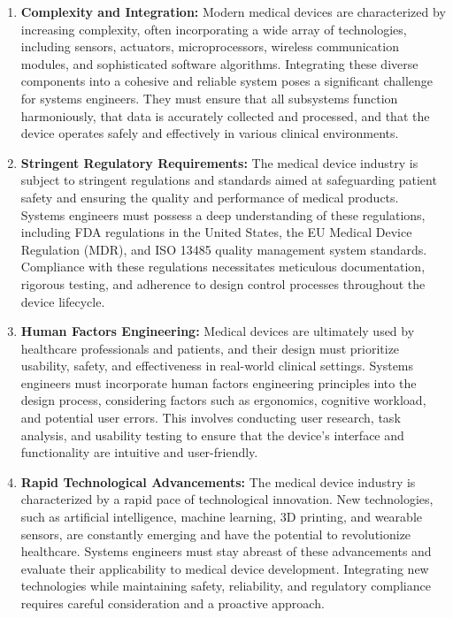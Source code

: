 \documentclass[conference]{IEEEtran}
\begin{document}
    \begin{enumerate}
        \item \textbf{Complexity and Integration:} Modern medical 
        devices are characterized by increasing complexity, often 
        incorporating a wide array of technologies, including sensors, 
        actuators, microprocessors, wireless communication modules, 
        and sophisticated software algorithms. Integrating these diverse 
        components into a cohesive and reliable system poses a significant 
        challenge for systems engineers. They must ensure that all 
        subsystems function harmoniously, that data is accurately 
        collected and processed, and that the device operates safely 
        and effectively in various clinical environments.

        \item \textbf{Stringent Regulatory Requirements:} The medical 
        device industry is subject to stringent regulations and 
        standards aimed at safeguarding patient safety and ensuring 
        the quality and performance of medical products. Systems 
        engineers must possess a deep understanding of these 
        regulations, including FDA regulations in the United States, 
        the EU Medical Device Regulation (MDR), and ISO 13485 quality 
        management system standards. Compliance with these regulations 
        necessitates meticulous documentation, rigorous testing, and 
        adherence to design control processes throughout the device 
        lifecycle.

        \item \textbf{Human Factors Engineering:} Medical devices are 
        ultimately used by healthcare professionals and patients, 
        and their design must prioritize usability, safety, and 
        effectiveness in real-world clinical settings. Systems 
        engineers must incorporate human factors engineering 
        principles into the design process, considering factors such 
        as ergonomics, cognitive workload, and potential user errors. 
        This involves conducting user research, task analysis, 
        and usability testing to ensure that the device's interface 
        and functionality are intuitive and user-friendly.

        \item \textbf{Rapid Technological Advancements:} The medical 
        device industry is characterized by a rapid pace of 
        technological innovation. New technologies, such as artificial 
        intelligence, machine learning, 3D printing, and wearable 
        sensors, are constantly emerging and have the potential to 
        revolutionize healthcare. Systems engineers must stay abreast 
        of these advancements and evaluate their applicability to 
        medical device development. Integrating new technologies 
        while maintaining safety, reliability, and regulatory 
        compliance requires careful consideration and a proactive 
        approach.
    \end{enumerate}
\end{document}
